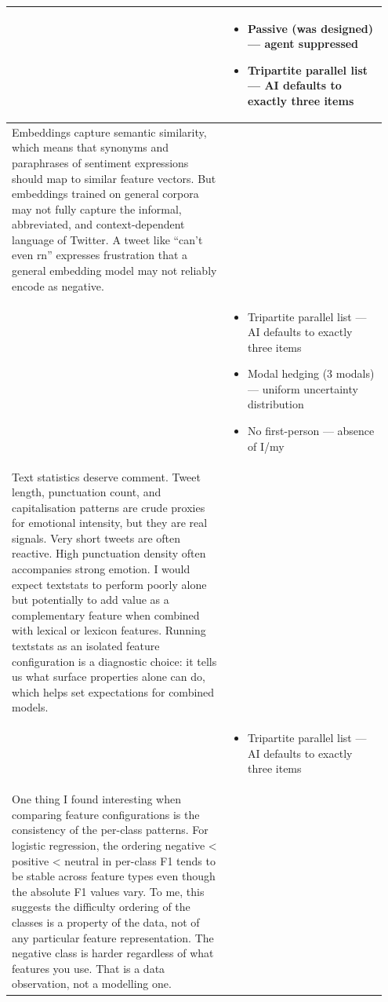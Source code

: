 \documentclass[11pt]{article}
\begin{document}
\begin{longtable}{|p{0.55\linewidth}|p{0.40\linewidth}|}
\hline
\rule[-3.5cm]{0pt}{3.5cm} & \begin{itemize}[leftmargin=1em,itemsep=1pt,topsep=1pt,parsep=0pt]
  \item Passive (was designed) --- agent suppressed
  \item Tripartite parallel list --- AI defaults to exactly three items
\end{itemize} \\
\hline
Embeddings capture semantic similarity, which means that synonyms and paraphrases of sentiment expressions should map to similar feature vectors. But embeddings trained on general corpora may not fully capture the informal, abbreviated, and context-dependent language of Twitter. A tweet like ``can't even rn'' expresses frustration that a general embedding model may not reliably encode as negative. & \\[2pt]
\hline
\rule[-3.5cm]{0pt}{3.5cm} & \begin{itemize}[leftmargin=1em,itemsep=1pt,topsep=1pt,parsep=0pt]
  \item Tripartite parallel list --- AI defaults to exactly three items
  \item Modal hedging (3 modals) --- uniform uncertainty distribution
  \item No first-person --- absence of I/my
\end{itemize} \\
\hline
Text statistics deserve comment. Tweet length, punctuation count, and capitalisation patterns are crude proxies for emotional intensity, but they are real signals. Very short tweets are often reactive. High punctuation density often accompanies strong emotion. I would expect textstats to perform poorly alone but potentially to add value as a complementary feature when combined with lexical or lexicon features. Running textstats as an isolated feature configuration is a diagnostic choice: it tells us what surface properties alone can do, which helps set expectations for combined models. & \\[2pt]
\hline
\rule[-3.5cm]{0pt}{3.5cm} & \begin{itemize}[leftmargin=1em,itemsep=1pt,topsep=1pt,parsep=0pt]
  \item Tripartite parallel list --- AI defaults to exactly three items
\end{itemize} \\
\hline
One thing I found interesting when comparing feature configurations is the consistency of the per-class patterns. For logistic regression, the ordering negative < positive < neutral in per-class F1 tends to be stable across feature types even though the absolute F1 values vary. To me, this suggests the difficulty ordering of the classes is a property of the data, not of any particular feature representation. The negative class is harder regardless of what features you use. That is a data observation, not a modelling one. & \\[2pt]

\end{longtable}
\end{document}
